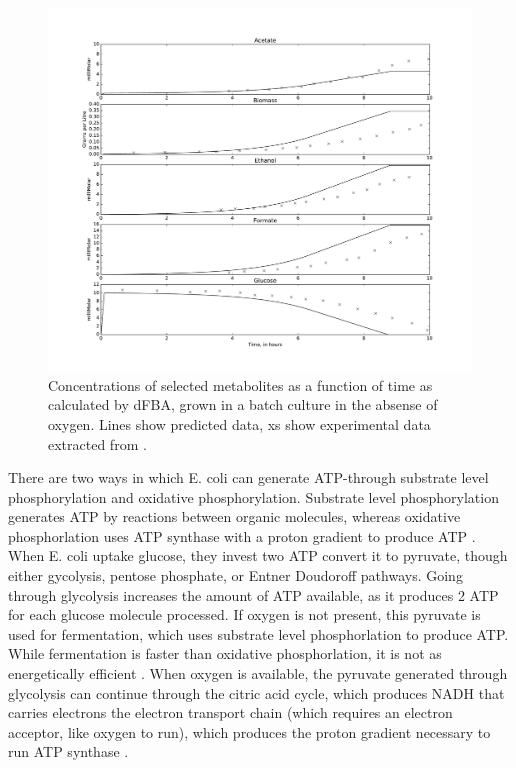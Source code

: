 \documentclass{article}
\begin{document}
\begin{figure}[!h]
\includegraphics[width=18cm]{../MikesNewNetwork/figures/AttemptToRecreateFig11}
\caption{Concentrations of selected metabolites as a function of time as calculated by dFBA, grown in a batch culture in the absense of oxygen. Lines show predicted data, xs show experimental data extracted from \cite{varma1994stoichiometric}. }
\label{fig:anaerobic}
\end{figure}
There are two ways in which E. coli can generate ATP-through substrate level phosphorylation and oxidative phosphorylation. Substrate level phosphorylation generates ATP by reactions between organic molecules, whereas oxidative phosphorlation uses ATP synthase with a proton gradient to produce ATP \cite{conway2015metabolism}. When E. coli uptake glucose, they invest two ATP convert it to pyruvate, though either gycolysis, pentose phosphate, or Entner Doudoroff pathways. Going through glycolysis increases the amount of ATP available, as it produces 2 ATP for each glucose molecule processed. If oxygen is not present, this pyruvate is used for fermentation, which uses substrate level phosphorlation to produce ATP. While fermentation is faster than oxidative phosphorlation, it is not as energetically efficient \cite{conway2015metabolism}. When oxygen is available, the pyruvate generated through glycolysis can continue through the citric acid cycle, which produces NADH that carries electrons the electron transport chain (which requires an electron acceptor, like oxygen to run), which produces the proton gradient necessary to run ATP synthase \cite{biobook}. 
\end{document}
